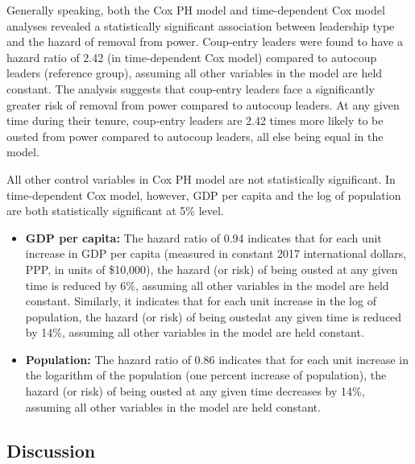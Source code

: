 \documentclass[
  12pt,
]{report}
\begin{document}
Generally speaking, both the Cox PH model and time-dependent Cox model
analyses revealed a statistically significant association between
leadership type and the hazard of removal from power. Coup-entry leaders
were found to have a hazard ratio of 2.42 (in time-dependent Cox model)
compared to autocoup leaders (reference group), assuming all other
variables in the model are held constant. The analysis suggests that
coup-entry leaders face a significantly greater risk of removal from
power compared to autocoup leaders. At any given time during their
tenure, coup-entry leaders are 2.42 times more likely to be ousted from
power compared to autocoup leaders, all else being equal in the model.

All other control variables in Cox PH model are not statistically
significant. In time-dependent Cox model, however, GDP per capita and
the log of population are both statistically significant at 5\% level.

\begin{itemize}
\item
  \textbf{GDP per capita:} The hazard ratio of 0.94 indicates that for
  each unit increase in GDP per capita (measured in constant 2017
  international dollars, PPP, in units of \$10,000), the hazard (or
  risk) of being ousted at any given time is reduced by 6\%, assuming
  all other variables in the model are held constant. Similarly, it
  indicates that for each unit increase in the log of population, the
  hazard (or risk) of being oustedat any given time is reduced by 14\%,
  assuming all other variables in the model are held constant.
\item
  \textbf{Population:} The hazard ratio of 0.86 indicates that for each
  unit increase in the logarithm of the population (one percent increase
  of population), the hazard (or risk) of being ousted at any given time
  decreases by 14\%, assuming all other variables in the model are held
  constant.
\end{itemize}

\subsection{Discussion}\label{discussion-1}
\end{document}
